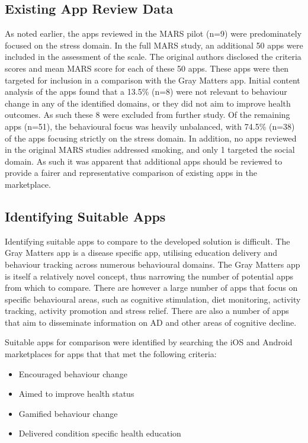 \subsection{Existing App Review Data}
As noted earlier, the apps reviewed in the MARS pilot (n=9) were predominately focused on the stress domain. In the full MARS study, an additional 50 apps were included in the assessment of the scale. The original authors disclosed the criteria scores and mean MARS score for each of these 50 apps. These apps were then targeted for inclusion in a comparison with the Gray Matters app. Initial content analysis of the apps found that a 13.5\% (n=8) were not relevant to behaviour change in any of the identified domains, or they did not aim to improve health outcomes. As such these 8 were excluded from further study. Of the remaining apps (n=51), the behavioural focus was heavily unbalanced, with 74.5\% (n=38) of the apps focusing strictly on the stress domain. In addition, no apps reviewed in the original MARS studies addressed smoking, and only 1 targeted the social domain. As such it was apparent that additional apps should be reviewed to provide a fairer and representative comparison of existing apps in the marketplace.

\subsection{Identifying Suitable Apps}
Identifying suitable apps to compare to the developed solution is difficult. The Gray Matters app is a disease specific app, utilising education delivery and behaviour tracking across numerous behavioural domains. The Gray Matters app is itself a relatively novel concept, thus narrowing the number of potential apps from which to compare. There are however a large number of apps that focus on specific behavioural areas, such as cognitive stimulation, diet monitoring, activity tracking, activity promotion and stress relief. There are also a number of apps that aim to disseminate information on AD and other areas of cognitive decline.

Suitable apps for comparison were identified by searching the iOS and Android marketplaces for apps that that met the following criteria:
\begin{itemize}[noitemsep,topsep=0pt]
\item Encouraged behaviour change
\item Aimed to improve health status
\item Gamified behaviour change
\item Delivered condition specific health education
\end{itemize}

